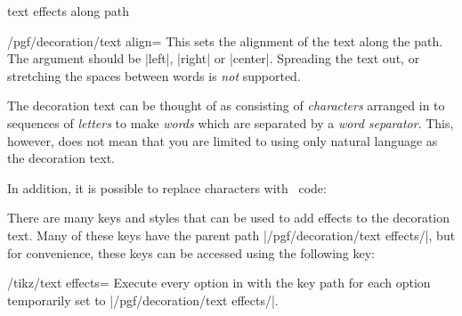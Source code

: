 \begin{decoration}{text effects along path}
    \begin{key}{/pgf/decoration/text align=}
        This sets the alignment of the text along the path. The 
        argument should be |left|, |right| or |center|. Spreading the text out,
        or stretching the spaces between words is \emph{not} supported.
    \end{key}

    The decoration text can be thought of as consisting of \emph{characters}
    arranged in to sequences of \emph{letters} to make \emph{words} which are
    separated by a \emph{word separator}. This, however, does not mean that you
    are limited to using only natural language as the decoration text.
\begin{codeexample}[]
\end{codeexample}

    In addition, it is possible to replace characters with \tikzname\ code:
\begin{codeexample}[]
\end{codeexample}

    There are many keys and styles that can be used to add effects to the
    decoration text. Many of these keys have the parent path
    |/pgf/decoration/text effects/|, but for convenience, these keys can be
    accessed using the following key:

    \begin{key}{/tikz/text effects=}
    Execute every option in  with the key path for each option
    temporarily set to |/pgf/decoration/text effects/|.
    \end{key}


\end{decoration}
